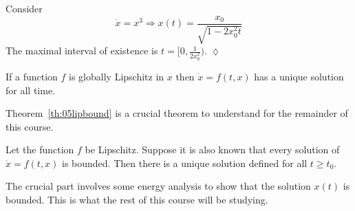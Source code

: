 \begin{example}
Consider
$$\dot{x} = x^3 \Rightarrow x(t) = \frac{x_0}{\sqrt{1-2x_0^2t}}$$
The maximal interval of existence is $t=[0,\frac{1}{2x_0^2})$.%
$\lozenge$
\end{example}

\begin{theorem}
If a function $f$ is globally Lipschitz in $x$ then $\dot{x}=f(t,x)$ has a unique solution for all time.
\end{theorem}

Theorem~\ref{th:05lipbound} is a crucial theorem to understand for the remainder of this course.
\begin{theorem}
\label{th:05lipbound}
Let the function $f$ be Lipschitz. Suppose it is also known that every solution of $\dot{x}=f(t,x)$ is bounded. Then there is a unique solution defined for all $t\geq t_0$.
\end{theorem}

The crucial part involves some energy analysis to show that the solution $x(t)$ is bounded. This is what the rest of this course will be studying.

